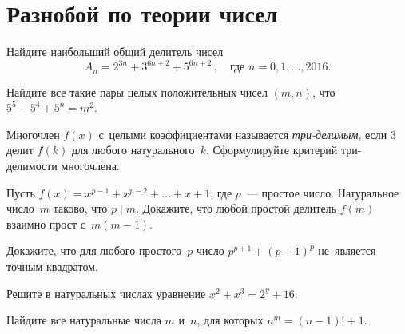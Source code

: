 
\section*{Разнобой по теории чисел}


\begingroup
    \def\divides{\mathrel{\vert}}%

\begin{problems}

\item
Найдите наибольший общий делитель чисел
\[
    A_{n} = 2^{3n} + 3^{6n+2} + 5^{6n+2}
\, , \quad
    \text{где $n = 0, 1, \ldots, 2016$}
.\]

\item
Найдите все такие пары целых положительных чисел $(m, n)$, что
$5^{5} - 5^{4} + 5^{n} = m^2$.

\item
Многочлен $f(x)$ с~целыми коэффициентами называется \emph{три-делимым}, если
$3$ делит $f(k)$ для любого натурального~$k$.
Сформулируйте критерий три-делимости многочлена.

\item
Пусть $f(x) = x^{p-1} + x^{p-2} + \ldots + x + 1$, где $p$~--- простое число.
Натуральное число~$m$ таково, что $p \divides m$.
Докажите, что любой простой делитель $f(m)$ взаимно прост с~$m (m - 1)$. 

\item
Докажите, что для любого простого~$p$ число $p^{p+1} + (p + 1)^p$ не~является
точным квадратом.


\item
Решите в натуральных числах уравнение $x^2 + x^3 = 2^{y} + 16$.

\item
Найдите все натуральные числа $m$ и~$n$, для которых $n^{m} = (n - 1)! + 1$.


\end{problems}

\endgroup %


